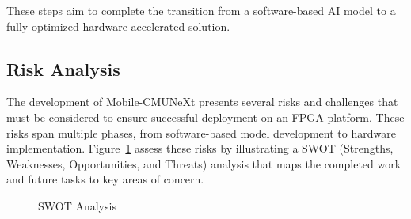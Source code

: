 \documentclass[lettersize,journal]{IEEEtran}
\begin{document}
These steps aim to complete the transition from a software-based AI model to a fully optimized hardware-accelerated solution.

\subsection{Risk Analysis} 
The development of Mobile-CMUNeXt presents several risks and challenges that must be considered to ensure successful deployment on an FPGA platform. These risks span multiple phases, from software-based model development to hardware implementation. Figure~\ref{fig:swot} assess these risks by illustrating a SWOT (Strengths, Weaknesses, Opportunities, and Threats) analysis that maps the completed work and future tasks to key areas of concern.

\vspace{0.5cm}
\begin{figure}
    \centerline{}
\caption{SWOT Analysis}
\label{fig:swot}
\end{figure}





\vfill
\end{document}
